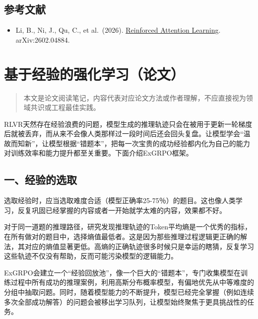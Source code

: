 \hypertarget{ux53c2ux8003ux6587ux732e-112}{%
\subsection{参考文献}\label{ux53c2ux8003ux6587ux732e-112}}

\begin{itemize}
\tightlist
\item
  Li, B., Ni, J., Qu, C., et al.~(2026). \href{https://arxiv.org/abs/2602.04884}{Reinforced Attention Learning}. arXiv:2602.04884.
\end{itemize}

\clearpage

\hypertarget{ux57faux4e8eux7ecfux9a8cux7684ux5f3aux5316ux5b66ux4e60ux8bbaux6587}{%
\section{基于经验的强化学习（论文）}\label{ux57faux4e8eux7ecfux9a8cux7684ux5f3aux5316ux5b66ux4e60ux8bbaux6587}}

\begin{quote}
本文是论文阅读笔记，内容代表对应论文方法或作者理解，不应直接视为领域共识或工程最佳实践。
\end{quote}

RLVR天然存在经验浪费的问题，模型生成的推理轨迹只会在被用于更新一轮梯度后就被丢弃，而从来不会像人类那样过一段时间后还会回头复盘。让模型学会``温故而知新''，让模型根据``错题本''，把每一次宝贵的成功经验都内化为自己的能力对训练效率和能力提升都至关重要。下面介绍ExGRPO框架。

\hypertarget{ux4e00ux7ecfux9a8cux7684ux9009ux53d6}{%
\subsection{一、经验的选取}\label{ux4e00ux7ecfux9a8cux7684ux9009ux53d6}}

选取经验时，应当选取难度合适（模型正确率25-75％）的题目。这也像人类学习，反复巩固已经掌握的内容或者一开始就学太难的内容，效果都不好。

对于同一道题的推理路径，研究发现推理轨迹的Token平均熵是一个优秀的指标，在所有做对的题目中，选择熵值最低者。这是因为那些推理过程逻辑更正确的解法，其对应的熵值显著更低。高熵的正确轨迹很多时候只是幸运的瞎猜，反复学习这些轨迹不仅没有帮助，反而可能污染模型的逻辑能力。

ExGRPO会建立一个``经验回放池''，像一个巨大的``错题本''，专门收集模型在训练过程中所有成功的推理案例，利用高斯分布概率模型，有偏地优先从中等难度的分组中抽取问题。同时，随着模型能力的不断提升，模型已经完全掌握（例如连续多次全部成功解答）的问题会被移出学习队列，让模型始终聚焦于更具挑战性的任务。


